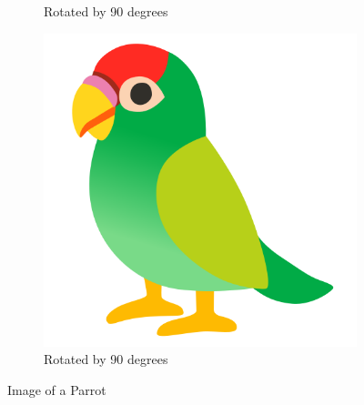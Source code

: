 \documentclass{article}
\begin{document}
\begin{figure}
\begin{subfigure}{0.3\textwidth}
			\caption{Rotated by 90 degrees}
		\end{subfigure}	
		\hfill
		\begin{subfigure}{0.3\textwidth}
			\centering
			\includegraphics[width=\textwidth, angle=90]{images/parrot.png}
			\caption{Rotated by 90 degrees}
		\end{subfigure}	
		\caption{Image of a Parrot}
	\end{figure}
\end{document}
